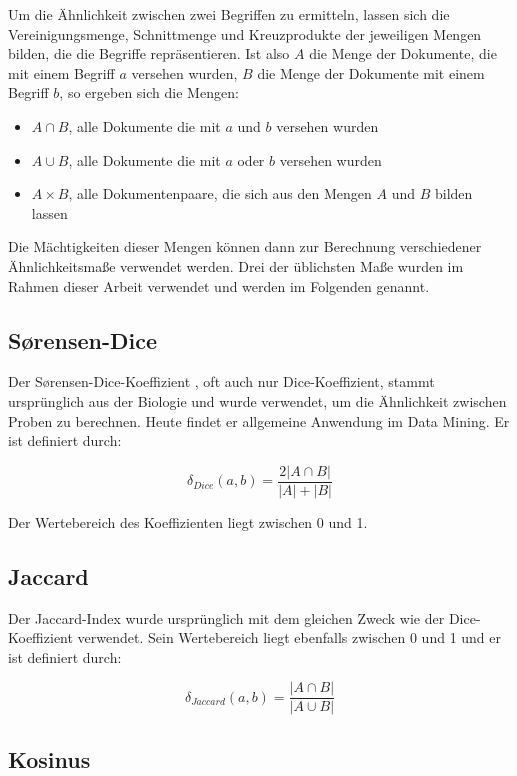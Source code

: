 Um die Ähnlichkeit zwischen zwei Begriffen zu ermitteln, lassen sich die Vereinigungsmenge, Schnittmenge und Kreuzprodukte der jeweiligen Mengen bilden, die die Begriffe repräsentieren. Ist also \(A\) die Menge der Dokumente, die mit einem Begriff \(a\) versehen wurden, \(B\) die Menge der Dokumente mit einem Begriff \(b\), so ergeben sich die Mengen:

\begin{itemize}
    \item \(A \cap B\), alle Dokumente die mit \(a\) und \(b\) versehen wurden
    \item \(A \cup B\), alle Dokumente die mit \(a\) oder \(b\) versehen wurden
    \item \(A \times B\), alle Dokumentenpaare, die sich aus den Mengen \(A\) und \(B\) bilden lassen
\end{itemize}

Die Mächtigkeiten dieser Mengen können dann zur Berechnung verschiedener Ähnlichkeitsmaße verwendet werden. Drei der üblichsten Maße wurden im Rahmen dieser Arbeit verwendet und werden im Folgenden genannt.

\subsection{Sørensen-Dice}

Der Sørensen-Dice-Koeffizient \cite{st1948} \cite{ld1945}, oft auch nur Dice-Koeffizient, stammt ursprünglich aus der Biologie und wurde verwendet, um die Ähnlichkeit zwischen Proben zu berechnen. Heute findet er allgemeine Anwendung im Data Mining. Er ist definiert durch:

\[
\delta_{Dice}(a, b) = \frac{2|A \cap B|}{|A|+|B|}
\]

Der Wertebereich des Koeffizienten liegt zwischen \num{0} und \num{1}.

\subsection{Jaccard}

Der Jaccard-Index \cite{pj19012} wurde ursprünglich mit dem gleichen Zweck wie der Dice-Koeffizient verwendet. Sein Wertebereich liegt ebenfalls zwischen \num{0} und \num{1} und er ist definiert durch:

\[
\delta_{Jaccard}(a,b) = \frac{|A \cap B|}{|A \cup B|}
\]

\subsection{Kosinus}

